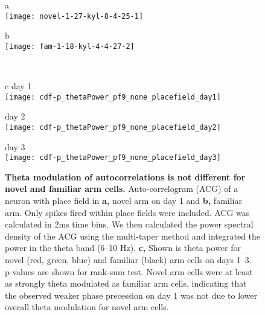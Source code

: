 \documentclass[preprint,rmp,preprintnumbers,floatfix]{revtex4}
\begin{document}
\newpage %
\begin{figure*}[htbp]
    \centering
    \parbox[t]{4.6in} {
        \parbox[t]{1.5in} { {\sf a}  \hfill \mbox{} \\
            \texttt{[image: novel-1-27-kyl-8-4-25-1]}
            }
        \parbox[t]{1.5in} { {\sf b}  \hfill \mbox{} \\
            \texttt{[image: fam-1-18-kyl-4-4-27-2]}
        }
        \hfill \mbox{} \\   \vskip5mm
        \parbox[t]{1.5in} { {\sf c} \hfill day 1\hfill\mbox{} \\
            \texttt{[image: cdf-p\_thetaPower\_pf9\_none\_placefield\_day1]}
        }
        \parbox[t]{1.5in} { \hfill day 2\hfill\mbox{} \\
            \texttt{[image: cdf-p\_thetaPower\_pf9\_none\_placefield\_day2]}
        }
        \parbox[t]{1.5in} { \hfill day 3\hfill\mbox{} \\
            \texttt{[image: cdf-p\_thetaPower\_pf9\_none\_placefield\_day3]}
        }
    }
    \caption{{\bf  Theta modulation of autocorrelations is not different for novel and familiar arm cells.  }
    Auto-correlogram (ACG) of a neuron with place field in 
    {\bf a,} novel arm on day 1
    and 
    {\bf b,} familiar arm. Only spikes fired within place fields were included.
    ACG was calculated in 2ms time bins.  We then calculated the power
    spectral density of the ACG using the multi-taper method and integrated the
    power in the theta band (6--10 Hz). 
    {\bf c,} Shown is theta power for novel (red,
    green, blue) and familiar (black) arm cells on days 1--3. p-values are shown
    for rank-sum test.  Novel arm cells were at least as strongly theta
    modulated as familiar arm cells, indicating that the observed weaker phase
    precession on day 1 was not due to lower overall theta modulation for novel
    arm cells.
    }
\end{figure*}
\end{document}
